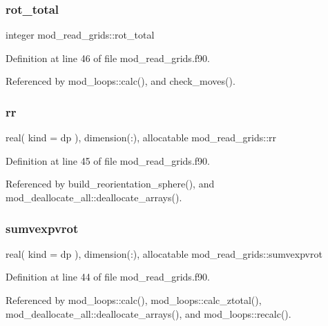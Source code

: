 \subsubsection{\texorpdfstring{rot\+\_\+total}{rot\_total}}
{\footnotesize\ttfamily integer mod\+\_\+read\+\_\+grids\+::rot\+\_\+total}



Definition at line 46 of file mod\+\_\+read\+\_\+grids.\+f90.



Referenced by mod\+\_\+loops\+::calc(), and check\+\_\+moves().

\mbox{\label{namespacemod__read__grids_a668db35acd10bd5a0c686c3ea19da6c2}} 
\subsubsection{\texorpdfstring{rr}{rr}}
{\footnotesize\ttfamily real( kind = dp ), dimension(\+:), allocatable mod\+\_\+read\+\_\+grids\+::rr}



Definition at line 45 of file mod\+\_\+read\+\_\+grids.\+f90.



Referenced by build\+\_\+reorientation\+\_\+sphere(), and mod\+\_\+deallocate\+\_\+all\+::deallocate\+\_\+arrays().

\mbox{\label{namespacemod__read__grids_aff025afae6b2b208286c65a85cd8f82a}} 
\subsubsection{\texorpdfstring{sumvexpvrot}{sumvexpvrot}}
{\footnotesize\ttfamily real( kind = dp ), dimension(\+:), allocatable mod\+\_\+read\+\_\+grids\+::sumvexpvrot}



Definition at line 44 of file mod\+\_\+read\+\_\+grids.\+f90.



Referenced by mod\+\_\+loops\+::calc(), mod\+\_\+loops\+::calc\+\_\+ztotal(), mod\+\_\+deallocate\+\_\+all\+::deallocate\+\_\+arrays(), and mod\+\_\+loops\+::recalc().

